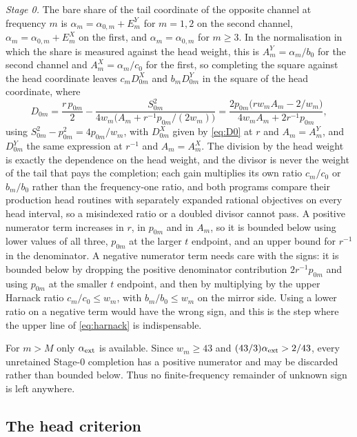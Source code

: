 \documentclass[10pt]{article}
\theoremstyle{remark}
\begin{document}
\emph{Stage 0.} The bare share of the tail coordinate of the opposite channel at frequency $m$ is $\alpha_m=\alpha_{0,m}+E^{Y}_m$ for $m=1,2$ on the second channel, $\alpha_m=\alpha_{0,m}+E^{X}_m$ on the first, and $\alpha_m=\alpha_{0,m}$ for $m\ge3$. In the normalisation in which the share is measured against the head weight, this is $A^{Y}_m=\alpha_m/b_0$ for the second channel and $A^{X}_m=\alpha_m/c_0$ for the first, so completing the square against the head coordinate leaves $c_mD^{X}_{0m}$ and $b_mD^{Y}_{0m}$ in the square of the head coordinate, where
\begin{equation}\label{eq:D0}
D_{0m}=\frac{r\,p_{0m}}2-\frac{S_{0m}^2}{4w_m\bigl(A_m+r^{-1}p_{0m}/(2w_m)\bigr)}
=\frac{2p_{0m}\bigl(rw_mA_m-2/w_m\bigr)}{4w_mA_m+2r^{-1}p_{0m}} ,
\end{equation}
using $S_{0m}^2-p_{0m}^2=4p_{0m}/w_m$, with $D^{X}_{0m}$ given by \eqref{eq:D0} at $r$ and $A_m=A^{Y}_m$, and $D^{Y}_{0m}$ the same expression at $r^{-1}$ and $A_m=A^{X}_m$. The division by the head weight is exactly the dependence on the head weight, and the divisor is never the weight of the tail that pays the completion; each gain multiplies its own ratio $c_m/c_0$ or $b_m/b_0$ rather than the frequency-one ratio, and both programs compare their production head routines with separately expanded rational objectives on every head interval, so a misindexed ratio or a doubled divisor cannot pass. A positive numerator term increases in $r$, in $p_{0m}$ and in $A_m$, so it is bounded below using lower values of all three, $p_{0m}$ at the larger $t$ endpoint, and an upper bound for $r^{-1}$ in the denominator. A negative numerator term needs care with the signs: it is bounded below by dropping the positive denominator contribution $2r^{-1}p_{0m}$ and using $p_{0m}$ at the smaller $t$ endpoint, and then by multiplying by the upper Harnack ratio $c_m/c_0\le w_m$, with $b_m/b_0\le w_m$ on the mirror side. Using a lower ratio on a negative term would have the wrong sign, and this is the step where the upper line of \eqref{eq:harnack} is indispensable.

For $m>M$ only $\alpha_{\rm ext}$ is available. Since $w_m\ge43$ and $(43/3)\alpha_{\rm ext}>2/43$, every unretained Stage-0 completion has a positive numerator and may be discarded rather than bounded below. Thus no finite-frequency remainder of unknown sign is left anywhere.

\subsection{The head criterion}
\end{document}
